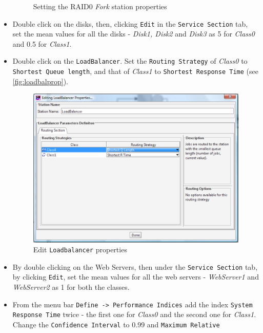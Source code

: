 \begin{itemize}
\begin{figure}[htb]
\begin{center}
    \end{center}
    \caption{Setting the RAID0 \emph{Fork} station properties}
    \label{fig:raid0prop}
\end{figure}

\item Double click on the disks, then, clicking \texttt{Edit} in
the \texttt{Service Section} tab, set the mean values for all the
disks - \emph{Disk1, Disk2} and \emph{Disk3} as 5 for
\emph{Class0} and 0.5 for \emph{Class1}.

\item Double click on the \texttt{LoadBalancer}. Set the
\texttt{Routing Strategy} of \emph{Class0} to \texttt{Shortest
Queue length}, and that of \emph{Class1} to \texttt{Shortest
Response Time} (see \autoref{fig:loadbalprop}).
\begin{figure}[htb]
    \begin{center}
        \includegraphics[scale=.5]{img/jsimg/12.22.eps}
    \end{center}
    \caption{Edit \texttt{Loadbalancer} properties}
    \label{fig:loadbalprop}
\end{figure}
\item By double clicking on the Web Servers, then under the
\texttt{Service Section} tab, by clicking \texttt{Edit}, set the
mean values for all the web servers - \emph{WebServer1} and
\emph{WebServer2} as 1 for both the classes. \item From the menu
bar \texttt{Define -> Performance Indices} add the index
\texttt{System Response Time} twice - the first one for
\emph{Class0} and the second one for \emph{Class1}. Change the
\texttt{Confidence Interval} to 0.99 and \texttt{Maximum Relative
}
\end{itemize}
